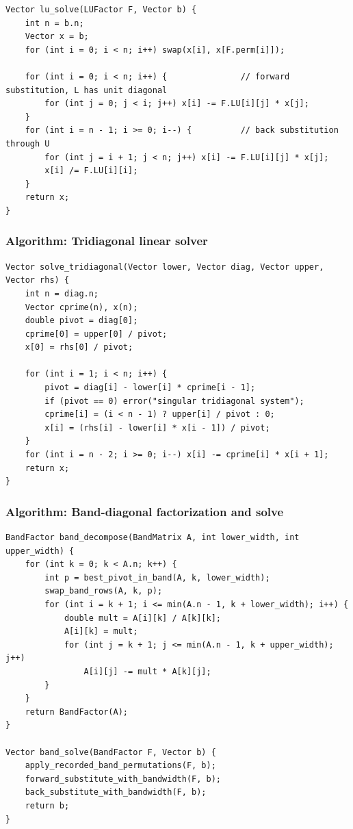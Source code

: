 \documentclass[11pt]{article}
\begin{document}
\begin{verbatim}
Vector lu_solve(LUFactor F, Vector b) {
    int n = b.n;
    Vector x = b;
    for (int i = 0; i < n; i++) swap(x[i], x[F.perm[i]]);

    for (int i = 0; i < n; i++) {               // forward substitution, L has unit diagonal
        for (int j = 0; j < i; j++) x[i] -= F.LU[i][j] * x[j];
    }
    for (int i = n - 1; i >= 0; i--) {          // back substitution through U
        for (int j = i + 1; j < n; j++) x[i] -= F.LU[i][j] * x[j];
        x[i] /= F.LU[i][i];
    }
    return x;
}
\end{verbatim}

\subsubsection{Algorithm: Tridiagonal linear solver}\label{algorithm-tridiagonal-linear-solver}

\begin{verbatim}
Vector solve_tridiagonal(Vector lower, Vector diag, Vector upper, Vector rhs) {
    int n = diag.n;
    Vector cprime(n), x(n);
    double pivot = diag[0];
    cprime[0] = upper[0] / pivot;
    x[0] = rhs[0] / pivot;

    for (int i = 1; i < n; i++) {
        pivot = diag[i] - lower[i] * cprime[i - 1];
        if (pivot == 0) error("singular tridiagonal system");
        cprime[i] = (i < n - 1) ? upper[i] / pivot : 0;
        x[i] = (rhs[i] - lower[i] * x[i - 1]) / pivot;
    }
    for (int i = n - 2; i >= 0; i--) x[i] -= cprime[i] * x[i + 1];
    return x;
}
\end{verbatim}

\subsubsection{Algorithm: Band-diagonal factorization and solve}\label{algorithm-band-diagonal-factorization-and-solve}

\begin{verbatim}
BandFactor band_decompose(BandMatrix A, int lower_width, int upper_width) {
    for (int k = 0; k < A.n; k++) {
        int p = best_pivot_in_band(A, k, lower_width);
        swap_band_rows(A, k, p);
        for (int i = k + 1; i <= min(A.n - 1, k + lower_width); i++) {
            double mult = A[i][k] / A[k][k];
            A[i][k] = mult;
            for (int j = k + 1; j <= min(A.n - 1, k + upper_width); j++)
                A[i][j] -= mult * A[k][j];
        }
    }
    return BandFactor(A);
}

Vector band_solve(BandFactor F, Vector b) {
    apply_recorded_band_permutations(F, b);
    forward_substitute_with_bandwidth(F, b);
    back_substitute_with_bandwidth(F, b);
    return b;
}
\end{verbatim}
\end{document}
